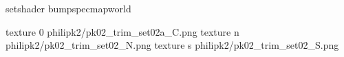 setshader bumpspecmapworld

texture 0 philipk2/pk02_trim_set02a_C.png
texture n philipk2/pk02_trim_set02_N.png
texture s philipk2/pk02_trim_set02_S.png

